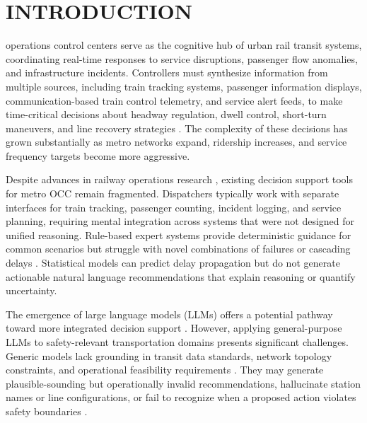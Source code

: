 \documentclass{IEEEoj}
\begin{document}
\section{INTRODUCTION}
\label{sec:introduction}

 operations control centers serve as the cognitive hub of urban rail transit systems, coordinating real-time responses to service disruptions, passenger flow anomalies, and infrastructure incidents. Controllers must synthesize information from multiple sources, including train tracking systems, passenger information displays, communication-based train control telemetry, and service alert feeds, to make time-critical decisions about headway regulation, dwell control, short-turn maneuvers, and line recovery strategies \cite{ceder2016public, hansen2014railway}. The complexity of these decisions has grown substantially as metro networks expand, ridership increases, and service frequency targets become more aggressive.

Despite advances in railway operations research \cite{dariano2007conflict, goverde2010delay, corman2010tabu}, existing decision support tools for metro OCC remain fragmented. Dispatchers typically work with separate interfaces for train tracking, passenger counting, incident logging, and service planning, requiring mental integration across systems that were not designed for unified reasoning. Rule-based expert systems provide deterministic guidance for common scenarios but struggle with novel combinations of failures or cascading delays \cite{botte2018dispatching}. Statistical models can predict delay propagation \cite{buchel2020empirical, dekker2022modelling} but do not generate actionable natural language recommendations that explain reasoning or quantify uncertainty.

The emergence of large language models (LLMs) offers a potential pathway toward more integrated decision support \cite{brown2020language, ouyang2022training}. However, applying general-purpose LLMs to safety-relevant transportation domains presents significant challenges. Generic models lack grounding in transit data standards, network topology constraints, and operational feasibility requirements \cite{wandelt2024large, hassija2025role}. They may generate plausible-sounding but operationally invalid recommendations, hallucinate station names or line configurations, or fail to recognize when a proposed action violates safety boundaries \cite{ji2023survey}.
\end{document}
